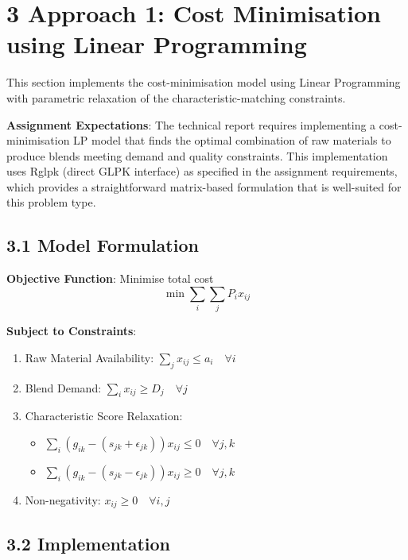 \documentclass[
]{article}
\providecommand{\tightlist}{%
  \setlength{\itemsep}{0pt}\setlength{\parskip}{0pt}}
\begin{document}
\section{3 Approach 1: Cost Minimisation using Linear
Programming}\label{approach-1-cost-minimisation-using-linear-programming}

This section implements the cost-minimisation model using Linear
Programming with parametric relaxation of the characteristic-matching
constraints.

\textbf{Assignment Expectations}: The technical report requires
implementing a cost-minimisation LP model that finds the optimal
combination of raw materials to produce blends meeting demand and
quality constraints. This implementation uses Rglpk (direct GLPK
interface) as specified in the assignment requirements, which provides a
straightforward matrix-based formulation that is well-suited for this
problem type.

\subsection{3.1 Model Formulation}\label{model-formulation}

\textbf{Objective Function}: Minimise total cost
\[\min \sum_{i} \sum_{j} P_i x_{ij}\]

\textbf{Subject to Constraints}:

\begin{enumerate}
\def\labelenumi{\arabic{enumi}.}
\tightlist
\item
  Raw Material Availability: \(\sum_{j} x_{ij} \le a_i \quad \forall i\)
\item
  Blend Demand: \(\sum_{i} x_{ij} \ge D_j \quad \forall j\)
\item
  Characteristic Score Relaxation:

  \begin{itemize}
  \tightlist
  \item
    \(\sum_{i} (g_{ik} - (s_{jk} + \epsilon_{jk})) x_{ij} \le 0 \quad \forall j, k\)
  \item
    \(\sum_{i} (g_{ik} - (s_{jk} - \epsilon_{jk})) x_{ij} \ge 0 \quad \forall j, k\)
  \end{itemize}
\item
  Non-negativity: \(x_{ij} \ge 0 \quad \forall i, j\)
\end{enumerate}

\subsection{3.2 Implementation}\label{implementation}
\end{document}
